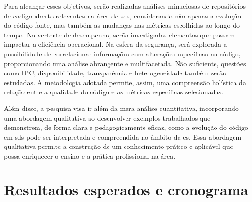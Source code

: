 Para alcançar esses objetivos, serão realizadas análises minuciosas de repositórios de código aberto relevantes na área de \gls{sds}, considerando não apenas a evolução do código-fonte, mas também as mudanças nas métricas escolhidas ao longo do tempo. Na vertente de desempenho, serão investigados elementos que possam impactar a eficiência operacional. Na esfera da segurança, será explorada a possibilidade de correlacionar informações com alterações específicas no código, proporcionando uma análise abrangente e multifacetada. Não suficiente, questões como IPC, disponibilidade, transparência e heterogeneidade também serão estudadas. A metodologia adotada permite, assim, uma compreensão holística da relação entre a qualidade do código e as métricas específicas selecionadas.

Além disso, a pesquisa visa ir além da mera análise quantitativa, incorporando uma abordagem qualitativa ao desenvolver exemplos trabalhados que demonstrem, de forma clara e pedagogicamente eficaz, como a evolução do código em \gls{sds} pode ser interpretada e compreendida no âmbito da \gls{es}. Essa abordagem qualitativa permite a construção de um conhecimento prático e aplicável que possa enriquecer o ensino e a prática profissional na área.

\section{Resultados esperados e cronograma}

